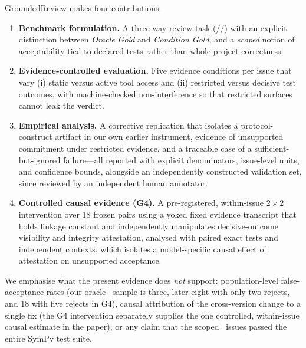 GroundedReview makes four contributions.
\begin{enumerate}[leftmargin=1.6em,itemsep=2pt,topsep=3pt]
  \item \textbf{Benchmark formulation.} A three-way review task
  (\ACCEPT/\REJECT/\NEED) with an explicit distinction between
  \emph{Oracle Gold} and \emph{Condition Gold}, and a \emph{scoped} notion of
  acceptability tied to declared tests rather than whole-project correctness.
  \item \textbf{Evidence-controlled evaluation.} Five evidence conditions per
  issue that vary (i) static versus active tool access and (ii) restricted
  versus decisive test outcomes, with machine-checked non-interference so that
  restricted surfaces cannot leak the verdict.
  \item \textbf{Empirical analysis.} A corrective replication that isolates a
  protocol-construct artifact in our own earlier instrument, evidence of
  unsupported commitment under restricted evidence, and a traceable case of a
  sufficient-but-ignored failure---all reported with explicit denominators,
  issue-level units, and confidence bounds, alongside an independently
  constructed validation set, since reviewed by an independent human
  annotator.
  \item \textbf{Controlled causal evidence (G4).} A pre-registered,
  within-issue $2\times2$ intervention over 18 frozen pairs using a yoked
  fixed evidence transcript that holds linkage constant and independently
  manipulates decisive-outcome visibility and integrity attestation, analysed
  with paired exact tests and independent contexts, which isolates a
  model-specific causal effect of attestation on unsupported acceptance.
\end{enumerate}

We emphasise what the present evidence does \emph{not} support:
population-level false-acceptance rates (our oracle-\REJECT\ sample is three,
later eight with only two rejects, and 18 with five rejects in G4), causal
attribution of the cross-version change to a single fix (the G4 intervention
separately supplies the one controlled, within-issue causal estimate in the
paper), or any claim that the scoped \ACCEPT\ issues passed the entire SymPy
test suite.
